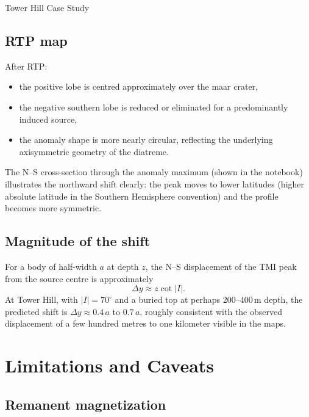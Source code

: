 \begin{activity}{Tower Hill Case Study}
\subsection{RTP map}

After RTP:
\begin{itemize}
  \item the positive lobe is centred approximately over the maar crater,
  \item the negative southern lobe is reduced or eliminated for a predominantly
        induced source,
  \item the anomaly shape is more nearly circular, reflecting the underlying
        axisymmetric geometry of the diatreme.
\end{itemize}

The N--S cross-section through the anomaly maximum (shown in the notebook)
illustrates the northward shift clearly: the peak moves to lower latitudes
(higher absolute latitude in the Southern Hemisphere convention) and the
profile becomes more symmetric.

\subsection{Magnitude of the shift}

For a body of half-width $a$ at depth $z$, the N--S displacement of the
TMI peak from the source centre is approximately
\begin{equation}
\Delta y \approx z \cot|I|.
\end{equation}
At Tower Hill, with $|I| = 70^\circ$ and a buried top at perhaps 200--400\,m
depth, the predicted shift is $\Delta y \approx 0.4\,a$ to $0.7\,a$,
roughly consistent with the observed displacement of a few hundred metres
to one kilometer visible in the maps.

\section{Limitations and Caveats}
\label{sec:limitations}

\subsection{Remanent magnetization}


\end{activity}

